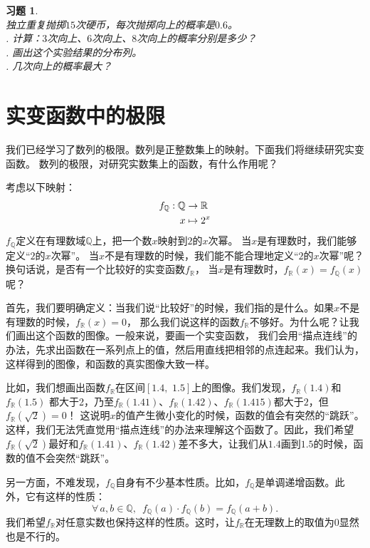 \documentclass[12pt,UTF8]{ctexbook}
\newtheorem{xt}{习题}[section]
\begin{document}
\begin{xt}
    \mbox{} \\
    独立重复抛掷$15$次硬币，每次抛掷向上的概率是$0.6$。\\
    . 计算：$3$次向上、$6$次向上、$8$次向上的概率分别是多少？\\
    . 画出这个实验结果的分布列。\\
    . 几次向上的概率最大？
\end{xt}

\chapter{实变函数中的极限}
我们已经学习了数列的极限。数列是正整数集上的映射。下面我们将继续研究实变函数。
数列的极限，对研究实数集上的函数，有什么作用呢？

考虑以下映射：
\begin{align}
    f_{\mathbb{Q}}: \mathbb{Q} &\rightarrow \mathbb{R}\notag \\
    x &\mapsto 2^x \notag
\end{align}
$f_{\mathbb{Q}}$定义在有理数域$\mathbb{Q}$上，把一个数$x$映射到$2$的$x$次幂。
当$x$是有理数时，我们能够定义“$2$的$x$次幂”。
当$x$不是有理数的时候，我们能不能合理地定义“$2$的$x$次幂”呢？换句话说，是否有一个比较好的实变函数$f_{\mathbb{R}}$，
当$x$是有理数时，$f_{\mathbb{R}}(x) = f_{\mathbb{Q}}(x)$呢？

首先，我们要明确定义：当我们说“比较好”的时候，我们指的是什么。如果$x$不是有理数的时候，$f_{\mathbb{R}}(x) = 0$，
那么我们说这样的函数$f_{\mathbb{R}}$不够好。为什么呢？让我们画出这个函数的图像。一般来说，要画一个实变函数，
我们会用“描点连线”的办法，先求出函数在一系列点上的值，然后用直线把相邻的点连起来。我们认为，这样得到的图像，和函数的真实图像大致一样。

比如，我们想画出函数$f_{\mathbb{R}}$在区间$[1.4,\,\,1.5]$上的图像。我们发现，$f_{\mathbb{R}}(1.4)$和$f_{\mathbb{R}}(1.5)$
都大于2，乃至$f_{\mathbb{R}}(1.41)$、$f_{\mathbb{R}}(1.42)$、$f_{\mathbb{R}}(1.415)$都大于$2$，但$f_{\mathbb{R}}(\sqrt{2}) = 0$！
这说明$x$的值产生微小变化的时候，函数的值会有突然的“跳跃”。这样，我们无法凭直觉用“描点连线”的办法来理解这个函数了。因此，我们希望
$f_{\mathbb{R}}(\sqrt{2})$最好和$f_{\mathbb{R}}(1.41)$、$f_{\mathbb{R}}(1.42)$差不多大，让我们从$1.4$画到$1.5$的时候，函数的值不会突然“跳跃”。

另一方面，不难发现，$f_{\mathbb{Q}}$自身有不少基本性质。比如，$f_{\mathbb{Q}}$是单调递增函数。此外，它有这样的性质：
$$\forall \, a, b\in \mathbb{Q}, \,\,\, f_{\mathbb{Q}}(a) \cdot f_{\mathbb{Q}}(b) = f_{\mathbb{Q}}(a + b).$$
我们希望$f_{\mathbb{R}}$对任意实数也保持这样的性质。这时，让$f_{\mathbb{R}}$在无理数上的取值为$0$显然也是不行的。
\end{document}
